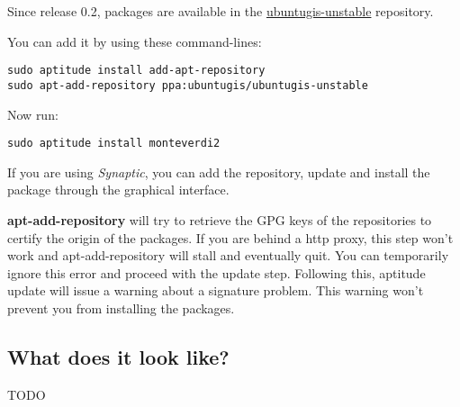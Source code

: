 Since release 0.2, \montNew packages are available in the
\href{https://launchpad.net/~ubuntugis/+archive/ubuntugis-unstable}{ubuntugis-unstable} repository.

You can add it by using these command-lines:
\begin{verbatim}
sudo aptitude install add-apt-repository
sudo apt-add-repository ppa:ubuntugis/ubuntugis-unstable
\end{verbatim}

Now run:
\begin{verbatim}
sudo aptitude install monteverdi2
\end{verbatim}

If you are using \emph{Synaptic}, you can add the repository, update and install the package through the
graphical interface.

\textbf{apt-add-repository} will try to retrieve the GPG keys of the
repositories to certify the origin of the packages. If you are behind a http
proxy, this step won't work and apt-add-repository will stall and eventually
quit. You can temporarily ignore this error and proceed with the update
step. Following this, aptitude update will issue a warning about a signature
problem. This warning won't prevent you from installing the packages.


\subsection{What does it look like?}
TODO

